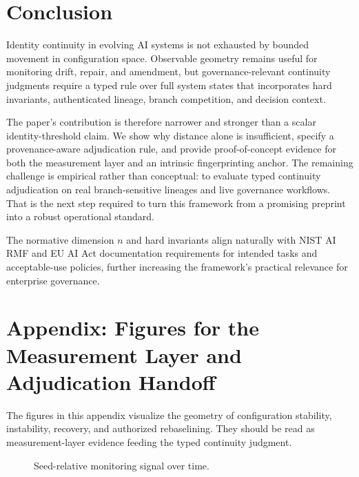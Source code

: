 \documentclass[11pt,a4paper]{article}
\begin{document}
\section{Conclusion}
Identity continuity in evolving AI systems is not exhausted by bounded movement in configuration space. Observable geometry remains useful for monitoring drift, repair, and amendment, but governance-relevant continuity judgments require a typed rule over full system states that incorporates hard invariants, authenticated lineage, branch competition, and decision context.

The paper's contribution is therefore narrower and stronger than a scalar identity-threshold claim. We show why distance alone is insufficient, specify a provenance-aware adjudication rule, and provide proof-of-concept evidence for both the measurement layer and an intrinsic fingerprinting anchor. The remaining challenge is empirical rather than conceptual: to evaluate typed continuity adjudication on real branch-sensitive lineages and live governance workflows. That is the next step required to turn this framework from a promising preprint into a robust operational standard.

The normative dimension \(n\) and hard invariants align naturally with NIST AI RMF and EU AI Act documentation requirements for intended tasks and acceptable-use policies, further increasing the framework's practical relevance for enterprise governance.

\appendix
\section{Appendix: Figures for the Measurement Layer and Adjudication Handoff}

The figures in this appendix visualize the geometry of configuration stability, instability, recovery, and authorized rebaselining. They should be read as measurement-layer evidence feeding the typed continuity judgment.

\begin{figure}[htbp]
    \centering
    \caption{Seed-relative monitoring signal over time.}
    \label{fig:1}
\end{figure}
\end{document}
